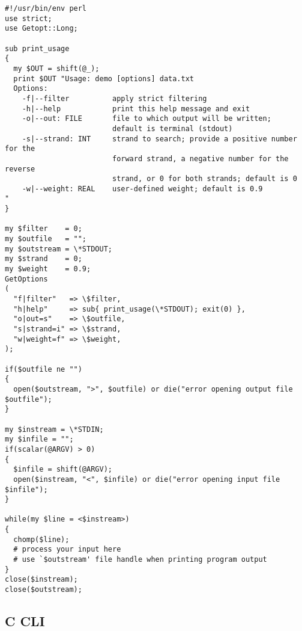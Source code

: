 \documentclass{article}
\begin{document}
\begin{verbatim}
#!/usr/bin/env perl
use strict;
use Getopt::Long;

sub print_usage
{
  my $OUT = shift(@_);
  print $OUT "Usage: demo [options] data.txt
  Options:
    -f|--filter          apply strict filtering
    -h|--help            print this help message and exit
    -o|--out: FILE       file to which output will be written;
                         default is terminal (stdout)
    -s|--strand: INT     strand to search; provide a positive number for the
                         forward strand, a negative number for the reverse
                         strand, or 0 for both strands; default is 0
    -w|--weight: REAL    user-defined weight; default is 0.9
"
}

my $filter    = 0;
my $outfile   = "";
my $outstream = \*STDOUT;
my $strand    = 0;
my $weight    = 0.9;
GetOptions
(
  "f|filter"   => \$filter,
  "h|help"     => sub{ print_usage(\*STDOUT); exit(0) },
  "o|out=s"    => \$outfile,
  "s|strand=i" => \$strand,
  "w|weight=f" => \$weight,
);

if($outfile ne "")
{
  open($outstream, ">", $outfile) or die("error opening output file $outfile");
}

my $instream = \*STDIN;
my $infile = "";
if(scalar(@ARGV) > 0)
{
  $infile = shift(@ARGV);
  open($instream, "<", $infile) or die("error opening input file $infile");
}

while(my $line = <$instream>)
{
  chomp($line);
  # process your input here
  # use `$outstream' file handle when printing program output
}
close($instream);
close($outstream);
\end{verbatim}

\subsection{C CLI}
\end{document}
